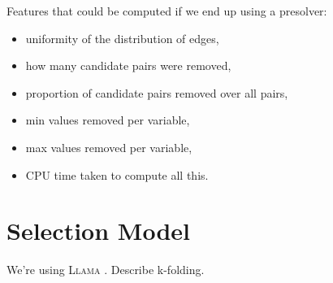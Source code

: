 \documentclass{article}
\begin{document}
Features that could be computed if we end up using a presolver:

\begin{itemize}
\item uniformity of the distribution of edges,
\item how many candidate pairs were removed,
\item proportion of candidate pairs removed over all pairs,
\item min values removed per variable,
\item max values removed per variable,
\item CPU time taken to compute all this.
\end{itemize}

\section{Selection Model}
We're using \textsc{Llama} \cite{kotthoff_llama_2013}. Describe k-folding.

\printbibliography
\end{document}
